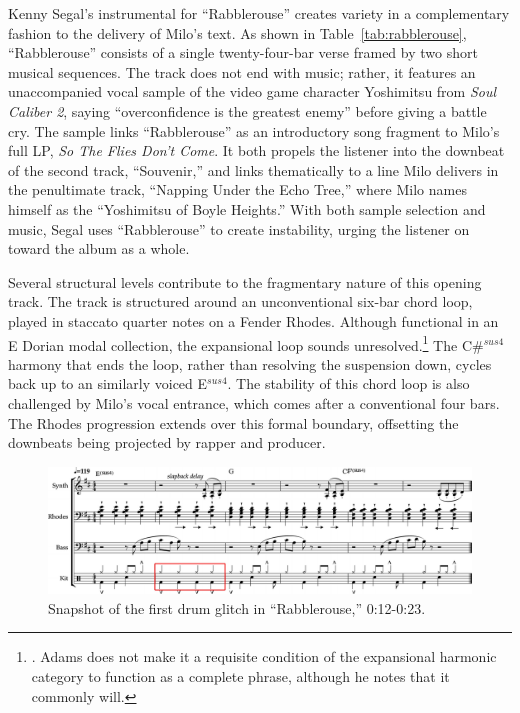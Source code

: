 Kenny Segal's instrumental for ``Rabblerouse'' creates variety in a complementary fashion to the 
delivery of Milo's text. As shown in Table~\ref{tab:rabblerouse}, ``Rabblerouse'' consists of a single
twenty-four-bar verse framed by two short musical sequences. The track does not end with music; rather, 
it features an unaccompanied vocal sample of the video game character Yoshimitsu from \emph{Soul Caliber 2},
saying ``overconfidence is the greatest enemy'' before giving a battle cry. The sample links ``Rabblerouse''
as an introductory song fragment to Milo's full LP, \emph{So The Flies Don't Come}. It both propels the
listener into the downbeat of the second track, ``Souvenir,'' and links thematically to a line Milo 
delivers in the penultimate track, ``Napping Under the Echo Tree,'' where Milo names himself as the
``Yoshimitsu of Boyle Heights.'' With both sample selection and music, Segal uses ``Rabblerouse'' to 
create instability, urging the listener on toward the album as a whole.

Several structural levels contribute to the fragmentary nature of this opening track. The track is 
structured around an unconventional six-bar chord loop, played in staccato quarter notes on a Fender
Rhodes. Although functional in an E Dorian modal collection, the expansional loop sounds
unresolved.\footnote{\cite{kyleadamsHarmonicSyntacticMotivic2020}. Adams does not make it a 
requisite condition of the expansional harmonic category to function as a complete phrase, although 
he notes that it commonly will.} The C\#$^{sus4}$ harmony that ends the loop, rather than resolving 
the suspension down, cycles back up to an similarly voiced E$^{sus4}$. The stability of this chord 
loop is also challenged by Milo's vocal entrance, which comes after a conventional four bars. The 
Rhodes progression extends over this formal boundary, offsetting the downbeats being projected by 
rapper and producer.

    \begin{figure}[ht]
        \centering
        \includegraphics[width=\textwidth]{images/figures/chp 02/012023rabblefirstglitch.pdf}
        \caption{Snapshot of the first drum glitch in ``Rabblerouse,'' 0:12-0:23.}
        \label{fig:rabblefirstglitch}
    \end{figure}


